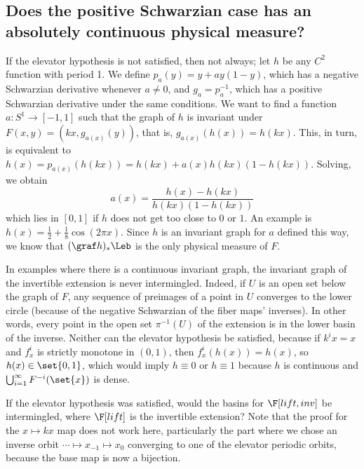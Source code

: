 \documentclass[main]{subfiles}
\begin{document}
\subsection*{Does the positive Schwarzian case has an absolutely continuous physical measure?}

If the elevator hypothesis is not satisfied, then not always; let \(h\) be any \(C^2\) function with period 1. We define \(p_a(y) = y + ay(1 - y)\), which has a negative Schwarzian derivative whenever \(a \neq 0\), and \(g_a = p_a^{-1}\), which has a positive Schwarzian derivative under the same conditions. We want to find a function \(a \colon S^1 \to [-1,1]\) such that the graph of \(h\) is invariant under \(F(x,y) = (kx, g_{a(x)}(y))\), that is, \(g_{a(x)}(h(x)) = h(kx)\). This, in turn, is equivalent to \(h(x) = p_{a(x)}(h(kx)) = h(kx) + a(x)h(kx)(1 - h(kx))\). Solving, we obtain
\begin{equation*}
  a(x) = \frac{h(x) - h(kx)}{h(kx)(1 - h(kx))}
\end{equation*}
which lies in \([0,1]\) if \(h\) does not get too close to \(0\) or \(1\). An example is \(h(x) = \frac{1}{2} + \frac{1}{8}\cos(2 \pi x)\). Since \(h\) is an invariant graph for \(a\) defined this way, we know that \((\graf h)_*\Leb\) is the only physical measure of \(F\).

In examples where there is a continuous invariant graph, the invariant graph of the invertible extension is never intermingled. Indeed, if \(U\) is an open set below the graph of \(F\), any sequence of preimages of a point in \(U\) converges to the lower circle (because of the negative Schwarzian of the fiber maps' inverses). In other words, every point in the open set \(\pi^{-1}(U)\) of the extension is in the lower basin of the inverse. Neither can the elevator hypothesis be satisfied, because if \(k^i x=x\) and \(f^i_x\) is strictly monotone in \((0,1)\), then \(f^i_x(h(x))=h(x)\), so \(h(x) \in \set{0,1}\), which would imply \(h \equiv 0\) or \(h \equiv 1\) because \(h\) is continuous and  \(\bigcup_{i = 1}^{\infty} F^{-i}(\set{x})\) is dense.

\begin{question}
  If the elevator hypothesis was satisfied, would the basins for \(\F[lift,inv]\) be intermingled, where \(\F[lift]\) is the invertible extension? Note that the proof for the \(x \mapsto kx\) map does not work here, particularly the part where we chose an inverse orbit \(\cdots \mapsto x_{-1} \mapsto x_{0}\) converging to one of the elevator periodic orbits, because the base map is now a bijection.
\end{question}
\end{document}

